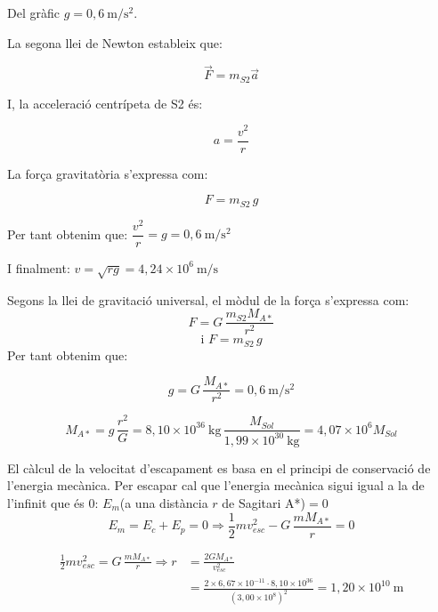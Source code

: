 \begin{solapartat}

 Del gràfic $g = 0,6\ \mathrm{m/s^2}$.

La segona llei de Newton estableix que:

 \[ \vec{F} = m_{S2}\vec{a} \]

I, la acceleració centrípeta de S2 és:

 \[ a = \frac{v^2}{r} \]

La força gravitatòria s'expressa com:

 \[ F = m_{S2}\,g \]

 Per tant obtenim que: $\dfrac{v^2}{r} = g = 0,6\ \mathrm{m/s^2}$

 I finalment: $v = \sqrt{rg} = 4,24\times 10^{6}\ \mathrm{m/s}$
\end{solapartat}

\begin{solapartat}
 Segons la llei de gravitació universal, el mòdul de la força s'expressa com:
\[ F = G\,\frac{m_{S2} M_{A*}}{r^2} \]
\[ \text{i } F = m_{S2}\,g \]
Per tant obtenim que:

 \[ g = G\,\frac{M_{A*}}{r^2} = 0,6\ \mathrm{m/s^2} \]

 \[ M_{A*} = g\,\frac{r^2}{G} = 8,10\times 10^{36}\ \mathrm{kg}\,\frac{M_{Sol}}{1,99\times 10^{30}\ \mathrm{kg}} = 4,07\times 10^{6} M_{Sol} \]

 El càlcul de la velocitat d'escapament es basa en el principi de conservació de l'energia mecànica. Per escapar cal que l'energia mecànica sigui igual a la de l'infinit que és 0: $E_m$(a una distància $r$ de Sagitari A*)${}= 0$
\[ E_m = E_c + E_p = 0 \Rightarrow \frac{1}{2} m v_{esc}^2 - G\,\frac{m M_{A*}}{r} = 0 \]

\begin{align*}
\frac{1}{2} m v_{esc}^2 = G\,\frac{m M_{A*}}{r} \Rightarrow r &= \frac{2 G M_{A*}}{v_{esc}^2}\\
&= \frac{2\times 6,67\times 10^{-11}\cdot 8,10\times 10^{36}}{\left(3,00\times 10^{8}\right)^2} = 1,20\times 10^{10}\ \mathrm{m}
\end{align*}
\end{solapartat}
